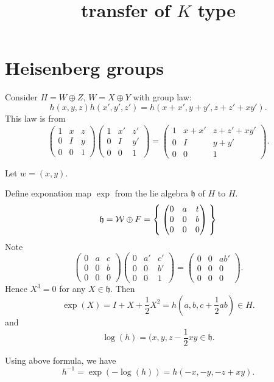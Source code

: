 \documentclass[12pt]{amsart}
\title{transfer of $K$ type}
\def\lww{\mathcal{W}}
\def\fhh{\mathfrak{h}}
\begin{document}
\maketitle

\section{Heisenberg groups}
Consider $H = W\oplus Z$, $W = X\oplus Y$ 
with group law: 
\[
h(x,y,z)h(x',y',z') = h(x+x', y+y', z+z'+xy').
\]
This law is from 
\[
\begin{pmatrix}
1 & x & z\\
0 & I & y\\
0 & 0 & 1
\end{pmatrix}
\begin{pmatrix}
1 & x' & z'\\
0 & I & y'\\
0 & 0 & 1
\end{pmatrix}
=
\begin{pmatrix}
1 & x+x' & z+z'+ x y'\\
0 & I & y+y'\\
0 & 0 & 1
\end{pmatrix}.
\]

Let $w = (x,y)$. 

Define exponation map $\exp$ from the lie algebra $\fhh$ of $H$ to $H$. 
\[
\fhh = \lww\oplus F= \Set{\begin{pmatrix}
    0 & a & t\\
    0 & 0 & b\\
    0 & 0 & 0
  \end{pmatrix}}
\]
Note
\[
\begin{pmatrix}
0 & a & c\\
0 & 0 & b\\
0 & 0 & 0
\end{pmatrix}
\begin{pmatrix}
0 & a' & c'\\
0 & 0 & b'\\
0 & 0 & 1
\end{pmatrix}
=
\begin{pmatrix}
0 & 0 & a b'\\
0 & 0 & 0\\
0 & 0 & 0
\end{pmatrix}.
\]
Hence $X^3 = 0$ for any $X\in \fhh$. 
Then 
\[
\exp(X) = I + X + \frac{1}{2}X^2= h(a,b, c+ \frac{1}{2} ab) \in H. \]
and
\[ 
\log(h) = (x,y, z-\frac{1}{2}xy\in \fhh. 
\]

Using above formula, we have
\[
h^{-1} = \exp(-\log(h)) = h(-x,-y,-z+x y).
\]
\end{document}

